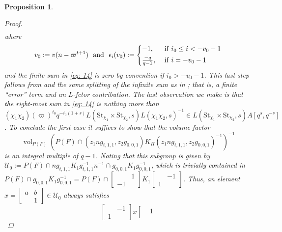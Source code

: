 \documentclass{amsart}
\theoremstyle{plain}
\newtheorem{prop}[thm]{Proposition}
\theoremstyle{plain}
\theoremstyle{remark}
\DeclareMathOperator{\vol}{vol}
\begin{document}
\begin{prop}
\begin{proof}
\begin{align}
        \end{align}
        where \begin{align}\label{eq: epsilon}v_0:=v(n-\varpi^{t+1})\ \ \mathrm{and}\ \ \epsilon_i(v_0):=\begin{dcases}
            -1, &\ \mathrm{if}\ i_0\leq i < -v_0-1\\
            \tfrac{-q}{q-1}, &\ \mathrm{if}\ i= -v_0-1 
        \end{dcases}\end{align}
        and the finite sum in \eqref{eq: 14} is zero by convention if $i_0>-v_0-1$. This last step follows from  and the same splitting of the infinite sum as in \cite[\S $6.3$]{groutides2024integral}; that is, a finite ``error'' term and an $L$-fctor contribution. The last observation we make is that the right-most sum in \eqref{eq: 14} is nothing more than $(\chi_1\chi_2)(\varpi)^{i_0}q^{-i_0(1+s)} L(\mathrm{St}_{\chi_1}\times \mathrm{St}_{\chi_2},s)L(\chi_1\chi_2,s)^{-1}\in L(\mathrm{St}_{\chi_1}\times \mathrm{St}_{\chi_2},s)A[q^s,q^{-s}]$. To conclude the first case it suffices to show that the volume factor
        $$\vol_{P(F)}\left(P(F)\cap \left( z_1ng_{t,1,1},z_2g_{0,0,1}\right) K_\Pi \left( z_1ng_{t,1,1},z_2g_{0,0,1}\right)^{-1}\right)^{-1}$$
        is an integral multiple of $q-1$. Noting that this subgroup is given by $\mathcal{U}_0:=P(F)\cap ng_{t,1,1} K_1 g_{t,1,1}^{-1}n^{-1}\cap g_{0,0,1}K_1g_{0,0,1}^{-1}$, which is trivially contained in $P(F)\cap g_{0,0,1}K_1g_{0,0,1}^{-1}=P(F)\cap \left[\begin{smallmatrix}
            & 1\\
            -1 & 
        \end{smallmatrix}\right]K_1 \left[\begin{smallmatrix}
            & -1\\
            1 & 
        \end{smallmatrix}\right]$. Thus, an element $x=\left[\begin{smallmatrix}
            a & b \\
            & 1
        \end{smallmatrix}\right]\in\mathcal{U}_0$ always satisfies 
$$\left[\begin{smallmatrix}
            & -1\\
            1 & 
        \end{smallmatrix}\right]x\left[\begin{smallmatrix}
            & 1\\

\end{smallmatrix}$$
\end{proof}
\end{prop}
\end{document}
